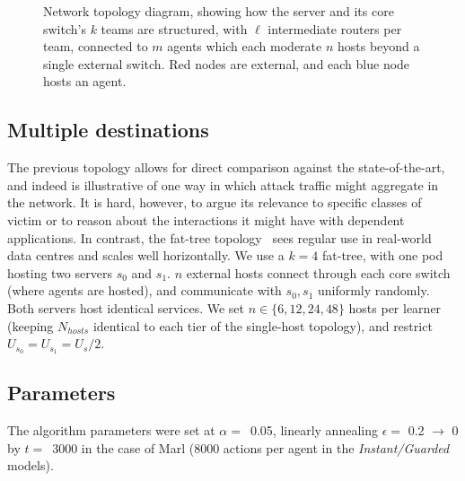 \begin{figure}
	\centering
	\resizebox{0.9\linewidth}{!}{}
	\caption[Tree-structured network topology diagram for evaluating a single-destination network.]{
		Network topology diagram, showing how the server and its core switch's $k$ teams are structured, with $\ell$ intermediate routers per team, connected to $m$ agents which each moderate $n$ hosts beyond a single external switch.
		Red nodes are external, and each blue node hosts an agent.
		\label{fig:marl-topol}
	}
\end{figure}

\subsection{Multiple destinations}
The previous topology allows for direct comparison against the state-of-the-art, and indeed is illustrative of one way in which attack traffic might aggregate in the network.
It is hard, however, to argue its relevance to specific classes of victim or to reason about the interactions it might have with dependent applications.
In contrast, the fat-tree topology~\parencite{DBLP:conf/sigcomm/Al-FaresLV08} sees regular use in real-world data centres and scales well horizontally.
We use a $k=4$ fat-tree, with one pod hosting two servers $s_0$ and $s_1$.
$n$ external hosts connect through each core switch (where agents are hosted), and communicate with $s_0, s_1$ uniformly randomly.
Both servers host identical services.
We set $n \in \{6, 12, 24, 48\}$ hosts per learner (keeping $N_{\mathit{hosts}}$ identical to each tier of the single-host topology), and restrict $U_{s_0} = U_{s_1} = U_s / 2$.

\subsection{Parameters}
The algorithm parameters were set at $\alpha=$~\num{0.05}, linearly annealing $\epsilon=$ \num{0.2} $\rightarrow$ 0 by $t=$~\num{3000} in the case of Marl (\num{8000} actions per agent in the \emph{Instant/Guarded} models).

